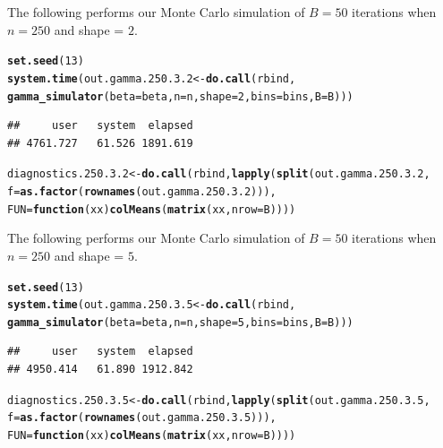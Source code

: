 \documentclass[11pt]{article}\usepackage[]{graphicx}\usepackage[]{color}
\makeatletter
\newcommand{\hlnum}[1]{\textcolor[rgb]{0.686,0.059,0.569}{#1}}%
\newcommand{\hlstd}[1]{\textcolor[rgb]{0.345,0.345,0.345}{#1}}%
\newcommand{\hlkwa}[1]{\textcolor[rgb]{0.161,0.373,0.58}{\textbf{#1}}}%
\newcommand{\hlkwb}[1]{\textcolor[rgb]{0.69,0.353,0.396}{#1}}%
\newcommand{\hlkwc}[1]{\textcolor[rgb]{0.333,0.667,0.333}{#1}}%
\newcommand{\hlkwd}[1]{\textcolor[rgb]{0.737,0.353,0.396}{\textbf{#1}}}%
\newenvironment{kframe}{%
 \def\at@end@of@kframe{}%
 \ifinner\ifhmode%
  \def\at@end@of@kframe{\end{minipage}}%
  \begin{minipage}{\columnwidth}%
 \fi\fi%
 \def\FrameCommand##1{\hskip\@totalleftmargin \hskip-\fboxsep
 \colorbox{shadecolor}{##1}\hskip-\fboxsep
     \hskip-\linewidth \hskip-\@totalleftmargin \hskip\columnwidth}%
 \MakeFramed {\advance\hsize-\width
   \@totalleftmargin\z@ \linewidth\hsize
   \@setminipage}}%
 {\par\unskip\endMakeFramed%
 \at@end@of@kframe}
\newenvironment{knitrout}{}{} %
\makeatother
\begin{document}
The following performs our Monte Carlo simulation of $B = 50$ iterations 
when $n = 250$ and shape = $2$.

\begin{knitrout}
\color{fgcolor}\begin{kframe}
\begin{alltt}
\hlkwd{set.seed}\hlstd{(}\hlnum{13}\hlstd{)}
\hlkwd{system.time}\hlstd{(out.gamma.250.3.2} \hlkwb{<-} \hlkwd{do.call}\hlstd{(rbind,}
  \hlkwd{gamma_simulator}\hlstd{(}\hlkwc{beta} \hlstd{= beta,} \hlkwc{n} \hlstd{= n,} \hlkwc{shape} \hlstd{=} \hlnum{2}\hlstd{,} \hlkwc{bins} \hlstd{= bins,} \hlkwc{B} \hlstd{= B)))}
\end{alltt}
\begin{verbatim}
##     user   system  elapsed 
## 4761.727   61.526 1891.619
\end{verbatim}
\begin{alltt}
\hlstd{diagnostics.250.3.2} \hlkwb{<-} \hlkwd{do.call}\hlstd{(rbind,} \hlkwd{lapply}\hlstd{(}\hlkwd{split}\hlstd{(out.gamma.250.3.2,}
  \hlkwc{f} \hlstd{=} \hlkwd{as.factor}\hlstd{(}\hlkwd{rownames}\hlstd{(out.gamma.250.3.2))),}
  \hlkwc{FUN} \hlstd{=} \hlkwa{function}\hlstd{(}\hlkwc{xx}\hlstd{)} \hlkwd{colMeans}\hlstd{(}\hlkwd{matrix}\hlstd{(xx,} \hlkwc{nrow} \hlstd{= B))))}
\end{alltt}
\end{kframe}
\end{knitrout}




The following performs our Monte Carlo simulation of $B = 50$ iterations 
when $n = 250$ and shape = $5$.

\begin{knitrout}
\color{fgcolor}\begin{kframe}
\begin{alltt}
\hlkwd{set.seed}\hlstd{(}\hlnum{13}\hlstd{)}
\hlkwd{system.time}\hlstd{(out.gamma.250.3.5} \hlkwb{<-} \hlkwd{do.call}\hlstd{(rbind,}
  \hlkwd{gamma_simulator}\hlstd{(}\hlkwc{beta} \hlstd{= beta,} \hlkwc{n} \hlstd{= n,} \hlkwc{shape} \hlstd{=} \hlnum{5}\hlstd{,} \hlkwc{bins} \hlstd{= bins,} \hlkwc{B} \hlstd{= B)))}
\end{alltt}
\begin{verbatim}
##     user   system  elapsed 
## 4950.414   61.890 1912.842
\end{verbatim}
\begin{alltt}
\hlstd{diagnostics.250.3.5} \hlkwb{<-} \hlkwd{do.call}\hlstd{(rbind,} \hlkwd{lapply}\hlstd{(}\hlkwd{split}\hlstd{(out.gamma.250.3.5,}
  \hlkwc{f} \hlstd{=} \hlkwd{as.factor}\hlstd{(}\hlkwd{rownames}\hlstd{(out.gamma.250.3.5))),}
  \hlkwc{FUN} \hlstd{=} \hlkwa{function}\hlstd{(}\hlkwc{xx}\hlstd{)} \hlkwd{colMeans}\hlstd{(}\hlkwd{matrix}\hlstd{(xx,} \hlkwc{nrow} \hlstd{= B))))}
\end{alltt}
\end{kframe}
\end{knitrout}
\end{document}
